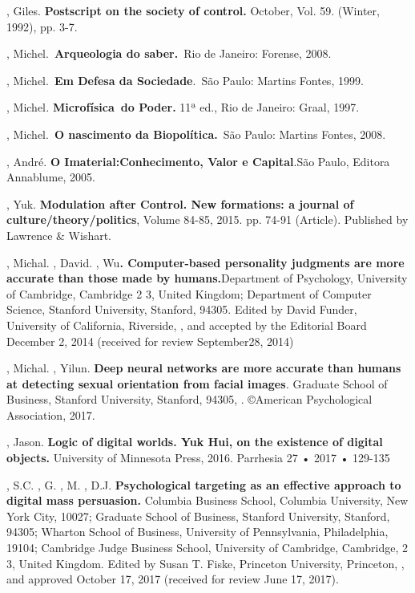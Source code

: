 , Giles. \textbf{Postscript on the society of control.} October,
Vol. 59. (Winter, 1992), pp. 3-7.

, Michel.~\textbf{Arqueologia do saber.}~Rio de Janeiro:
Forense, 2008.

, Michel.~\textbf{Em Defesa da Sociedade}.~São Paulo: Martins
Fontes, 1999.

, Michel\emph{.} \textbf{Microfísica~do Poder.} 11ª ed., Rio de
Janeiro: Graal, 1997.~

, Michel.~\textbf{O nascimento da Biopolítica.}~São Paulo:
Martins Fontes, 2008.

, André. \textbf{O Imaterial:Conhecimento, Valor e Capital}.São
Paulo, Editora Annablume, 2005.

, Yuk. \textbf{Modulation after Control. New formations: a journal of
culture/theory/politics}, Volume 84-85, 2015. pp. 74-91 (Article).
Published by Lawrence \& Wishart.

, Michal. , David. , Wu\textbf{. Computer-based
personality judgments are more accurate than those made by
humans.}Department of Psychology, University of Cambridge, Cambridge 2
3, United Kingdom; Department of Computer Science, Stanford
University, Stanford,  94305. Edited by David Funder, University of
California, Riverside, , and accepted by the Editorial Board December
2, 2014 (received for review September28, 2014)

, Michal. , Yilun. \textbf{Deep neural networks are more
accurate than humans at detecting sexual orientation from facial
images}\emph{.} Graduate School of Business, Stanford University,
Stanford, 94305, . ©American Psychological Association, 2017.

, Jason. \textbf{Logic of digital worlds. Yuk Hui, on the
existence of digital objects.} University of Minnesota Press, 2016.
Parrhesia 27 • 2017 • 129-135

, S.C. , G. , M. , D.J. \textbf{Psychological
targeting as an effective approach to digital mass persuasion.} Columbia
Business School, Columbia University, New York City,  10027; Graduate
School of Business, Stanford University, Stanford,  94305; Wharton
School of Business, University of Pennsylvania, Philadelphia,  19104;
Cambridge Judge Business School, University of Cambridge, Cambridge, 2
3, United Kingdom. Edited by Susan T. Fiske, Princeton University,
Princeton, , and approved October 17, 2017 (received for review June
17, 2017).


